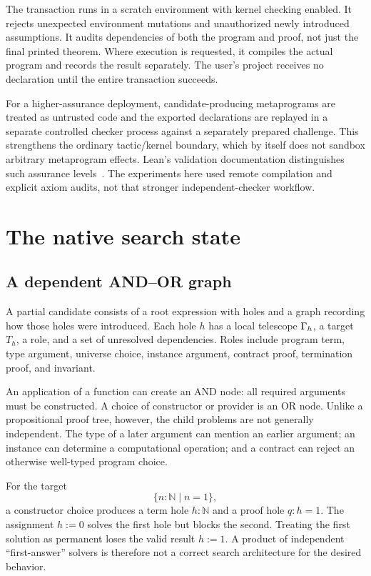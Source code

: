 The transaction runs in a scratch environment with kernel checking enabled. It rejects unexpected environment mutations and unauthorized newly introduced assumptions. It audits dependencies of both the program and proof, not just the final printed theorem. Where execution is requested, it compiles the actual program and records the result separately. The user's project receives no declaration until the entire transaction succeeds.

For a higher-assurance deployment, candidate-producing metaprograms are treated as untrusted code and the exported declarations are replayed in a separate controlled checker process against a separately prepared challenge. This strengthens the ordinary tactic/kernel boundary, which by itself does not sandbox arbitrary metaprogram effects. Lean's validation documentation distinguishes such assurance levels~\cite{validation}. The experiments here used remote compilation and explicit axiom audits, not that stronger independent-checker workflow.

\section{The native search state}
\label{sec:state}
\subsection{A dependent AND--OR graph}
A partial candidate consists of a root expression with holes and a graph recording how those holes were introduced. Each hole $h$ has a local telescope $\Gamma_h$, a target $T_h$, a role, and a set of unresolved dependencies. Roles include program term, type argument, universe choice, instance argument, contract proof, termination proof, and invariant.

An application of a function can create an AND node: all required arguments must be constructed. A choice of constructor or provider is an OR node. Unlike a propositional proof tree, however, the child problems are not generally independent. The type of a later argument can mention an earlier argument; an instance can determine a computational operation; and a contract can reject an otherwise well-typed program choice.

For the target
\[
 \{n:\mathbb N\mid n=1\},
\]
a constructor choice produces a term hole $h:\mathbb N$ and a proof hole $q:h=1$. The assignment $h:=0$ solves the first hole but blocks the second. Treating the first solution as permanent loses the valid result $h:=1$. A product of independent ``first-answer'' solvers is therefore not a correct search architecture for the desired behavior.

